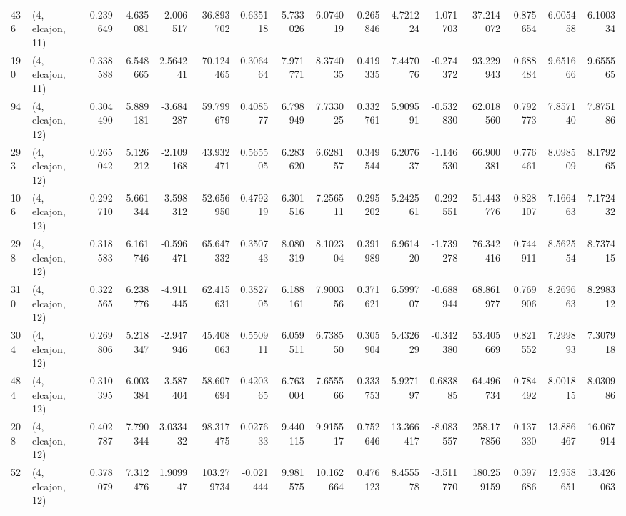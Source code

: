 \begin{tabular}{llrrrrrrrrrrrrrr}
436 &  (4, elcajon, 11) &   0.239649 &   4.635081 &  -2.006517 &    36.893702 &   0.635118 &   5.733026 &   6.074019 &  0.265846 &   4.721224 &  -1.071703 &     37.214072 &   0.875654 &    6.005458 &    6.100334 \\
190 &  (4, elcajon, 11) &   0.338588 &   6.548665 &   2.564241 &    70.124465 &   0.306464 &   7.971771 &   8.374035 &  0.419335 &   7.447076 &  -0.274372 &     93.229943 &   0.688484 &    9.651666 &    9.655565 \\
94  &  (4, elcajon, 12) &   0.304490 &   5.889181 &  -3.684287 &    59.799679 &   0.408577 &   6.798949 &   7.733025 &  0.332761 &   5.909591 &  -0.532830 &     62.018560 &   0.792773 &    7.857140 &    7.875186 \\
293 &  (4, elcajon, 12) &   0.265042 &   5.126212 &  -2.109168 &    43.932471 &   0.565505 &   6.283620 &   6.628157 &  0.349544 &   6.207637 &  -1.146530 &     66.900381 &   0.776461 &    8.098509 &    8.179265 \\
106 &  (4, elcajon, 12) &   0.292710 &   5.661344 &  -3.598312 &    52.656950 &   0.479219 &   6.301516 &   7.256511 &  0.295202 &   5.242561 &  -0.292551 &     51.443776 &   0.828107 &    7.166463 &    7.172432 \\
298 &  (4, elcajon, 12) &   0.318583 &   6.161746 &  -0.596471 &    65.647332 &   0.350743 &   8.080319 &   8.102304 &  0.391989 &   6.961420 &  -1.739278 &     76.342416 &   0.744911 &    8.562554 &    8.737415 \\
310 &  (4, elcajon, 12) &   0.322565 &   6.238776 &  -4.911445 &    62.415631 &   0.382705 &   6.188161 &   7.900356 &  0.371621 &   6.599707 &  -0.688944 &     68.861977 &   0.769906 &    8.269663 &    8.298312 \\
304 &  (4, elcajon, 12) &   0.269806 &   5.218347 &  -2.947946 &    45.408063 &   0.550911 &   6.059511 &   6.738550 &  0.305904 &   5.432629 &  -0.342380 &     53.405669 &   0.821552 &    7.299893 &    7.307918 \\
484 &  (4, elcajon, 12) &   0.310395 &   6.003384 &  -3.587404 &    58.607694 &   0.420365 &   6.763004 &   7.655566 &  0.333753 &   5.927197 &   0.683885 &     64.496734 &   0.784492 &    8.001815 &    8.030986 \\
208 &  (4, elcajon, 12) &   0.402787 &   7.790344 &   3.033432 &    98.317475 &   0.027633 &   9.440115 &   9.915517 &  0.752646 &  13.366417 &  -8.083557 &    258.177856 &   0.137330 &   13.886467 &   16.067914 \\
52  &  (4, elcajon, 12) &   0.378079 &   7.312476 &   1.909947 &   103.279734 &  -0.021444 &   9.981575 &  10.162664 &  0.476123 &   8.455578 &  -3.511770 &    180.259159 &   0.397686 &   12.958651 &   13.426063 \\

\end{tabular}
